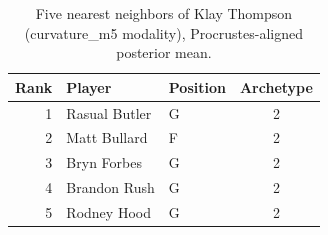 \begin{table}[htbp]
  \centering\small
  \begin{tabular}{rllc}
    \toprule
    Rank & Player & Position & Archetype \\
    \midrule
    1 & Rasual Butler & G & 2 \\
    2 & Matt Bullard & F & 2 \\
    3 & Bryn Forbes & G & 2 \\
    4 & Brandon Rush & G & 2 \\
    5 & Rodney Hood & G & 2 \\
    \bottomrule
  \end{tabular}
  \caption{Five nearest neighbors of Klay Thompson (curvature_m5 modality), Procrustes-aligned posterior mean.}
  \label{tab:Klay_Thompson_neighbors_curvature_m5}
\end{table}

